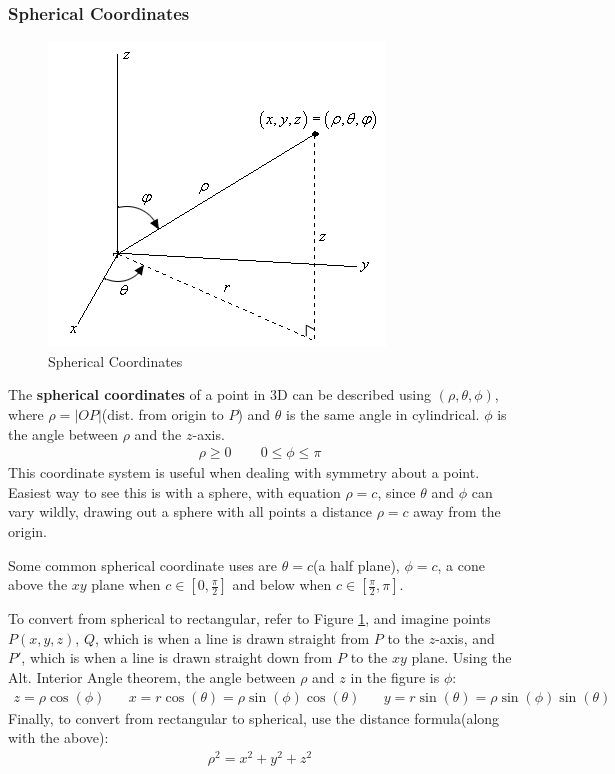 \documentclass{article}
\begin{document}
\subsubsection{Spherical Coordinates}
\begin{figure}[H]
\begin{center}
\includegraphics[scale=0.6,angle=0]{spherical.png}
\caption{Spherical Coordinates}
\label{sphcoords}
\end{center}
\end{figure}
The \textbf{spherical coordinates} of a point in 3D can be described using $(\rho, \theta, \phi)$, where $\rho = |OP|$(dist. from origin to $P$) and $\theta$ is the same angle in cylindrical. $\phi$ is the angle between $\rho$ and the $z$-axis.
\begin{gather*}
    \rho \geqslant 0\hspace{25pt}0 \leqslant \phi \leqslant \pi
\end{gather*}
This coordinate system is useful when dealing with symmetry about a point. Easiest way to see this is with a sphere, with equation $\rho = c$, since $\theta$ and $\phi$ can vary wildly, drawing out a sphere with all points a distance $\rho = c$ away from the origin.

Some common spherical coordinate uses are $\theta = c$(a half plane), $\phi = c$, a cone above the $xy$ plane when $c \in [0, \frac{\pi}{2}]$ and below when $c \in [\frac{\pi}{2},\pi]$.

To convert from spherical to rectangular, refer to Figure \ref{sphcoords}, and imagine points $P(x,y,z)$, $Q$, which is when a line is drawn straight from $P$ to the $z$-axis, and $P'$, which is when a line is drawn straight down from $P$ to the $xy$ plane. Using the Alt. Interior Angle theorem, the angle between $\rho$ and $z$ in the figure is $\phi$:
\begin{gather*}
    z = \rho\cos(\phi)\hspace{20pt}x = r\cos(\theta) = \rho\sin(\phi)\cos(\theta)\hspace{20pt}y = r\sin(\theta) = \rho\sin(\phi)\sin(\theta)
\end{gather*}
Finally, to convert from rectangular to spherical, use the distance formula(along with the above):
\begin{gather*}
    \rho^2 = x^2 + y^2 + z^2
\end{gather*}
\end{document}
